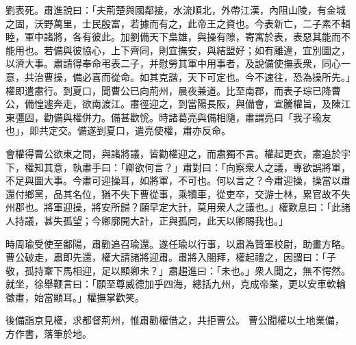\begin{pinyinscope}
 
劉表死。肅進說曰：「夫荊楚與國鄰接，水流順北，外帶江漢，內阻山陵，有金城之固，沃野萬里，士民殷富，若據而有之，此帝王之資也。今表新亡，二子素不輯睦，軍中諸將，各有彼此。加劉備天下梟雄，與操有隙，寄寓於表，表惡其能而不能用也。若備與彼協心，上下齊同，則宜撫安，與結盟好；如有離違，宜別圖之，以濟大事。肅請得奉命弔表二子，并慰勞其軍中用事者，及說備使撫表衆，同心一意，共治曹操，備必喜而從命。如其克諧，天下可定也。今不速往，恐為操所先。」權即遣肅行。到夏口，聞曹公已向荊州，晨夜兼道。比至南郡，而表子琮已降曹公，備惶遽奔走，欲南渡江。肅徑迎之，到當陽長阪，與備會，宣騰權旨，及陳江東彊固，勸備與權併力。備甚歡恱。時諸葛亮與備相隨，肅謂亮曰「我子瑜友也」，即共定交。備遂到夏口，遣亮使權，肅亦反命。
 
 
會權得曹公欲東之問，與諸將議，皆勸權迎之，而肅獨不言。權起更衣，肅追於宇下，權知其意，執肅手曰：「卿欲何言？」肅對曰：「向察衆人之議，專欲誤將軍，不足與圖大事。今肅可迎操耳，如將軍，不可也。何以言之？今肅迎操，操當以肅還付鄉黨，品其名位，猶不失下曹從事，乘犢車，從吏卒，交游士林，累官故不失州郡也。將軍迎操，將安所歸？願早定大計，莫用衆人之議也。」權歎息曰：「此諸人持議，甚失孤望；今卿廓開大計，正與孤同，此天以卿賜我也。」
 
 
 
 
 時周瑜受使至鄱陽，肅勸追召瑜還。遂任瑜以行事，以肅為贊軍校尉，助畫方略。曹公破走，肅即先還，權大請諸將迎肅。肅將入閤拜，權起禮之，因謂曰：「子敬，孤持鞌下馬相迎，足以顯卿未？」肅趨進曰：「未也。」衆人聞之，無不愕然。就坐，徐舉鞭言曰：「願至尊威德加乎四海，總括九州，克成帝業，更以安車軟輪徵肅，始當顯耳。」權撫掌歡笑。
 
 
後備詣京見權，求都督荊州，惟肅勸權借之，共拒曹公。
 曹公聞權以土地業備，方作書，落筆於地。
 

\end{pinyinscope}

